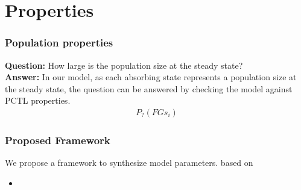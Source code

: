 \documentclass{beamer}
\begin{document}
\section{Properties}
\begin{frame}
  \frametitle{Population properties}
  \textbf{Question:} How large is the population size at the steady state?\\
  \textbf{Answer:} In our model, as each absorbing state represents a population
  size at the steady state, the question can be answered by checking the model
  against PCTL properties.
  \begin{align*}
    P_{?}(FG s_i)
  \end{align*}
\end{frame}


\begin{frame}
  \frametitle{Proposed Framework}
  We propose a framework to synthesize model parameters. based on 
  \begin{itemize}
  \item 
  \end{itemize}
\end{frame}
\end{document}
